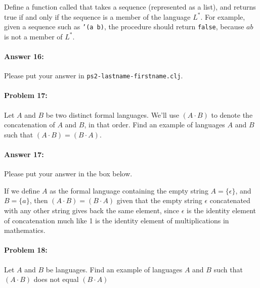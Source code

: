 \documentclass[10pt]{article}
\newenvironment{AnswerBox}{\begin{mdframed}[style=simple]}{\end{mdframed}}
\newcommand{\required}[1]{{\color{blue}{#1}}}
\newcommand{\PSnum}{2}
\begin{document}
Define a function called \required{\texttt{in-L-star?}} that takes a sequence
(represented as a list), and returns true if and only if the sequence is a
member of the language $L^*$. For example, given a sequence such as \texttt{'(a
b)}, the procedure should return \texttt{false}, because $ab$ is not a member of
$L^*$.

\paragraph{Answer 16:} Please put your answer in
\texttt{ps\PSnum-lastname-firstname.clj}.

\noindent\hrulefill %

\paragraph{Problem 17:}
Let $A$ and $B$ be two distinct formal languages. We'll use $(A\cdot B)$ to
denote the concatenation of $A$ and $B$, in that order. Find an example of
languages $A$ and $B$ such that $(A\cdot B)=(B\cdot A)$.

\paragraph{Answer 17:} Please put your answer in the box below.

\begin{AnswerBox}%


  If we define $A$ as the formal language containing the empty string $A = \{\epsilon\}$, and $B = \{a\}$, then $(A\cdot B)=(B\cdot A)$ given that the empty string $\epsilon$ concatenated with any other string gives back the same element, since $\epsilon$ is the identity element of concatenation much like 1 is the identity element of multiplications in mathematics.

\end{AnswerBox}%

\noindent\hrulefill %

\paragraph{Problem 18:}
Let $A$ and $B$ be languages. Find an example of languages $A$ and $B$ such that
$(A\cdot B)$ does not equal $(B\cdot A)$
\end{document}
